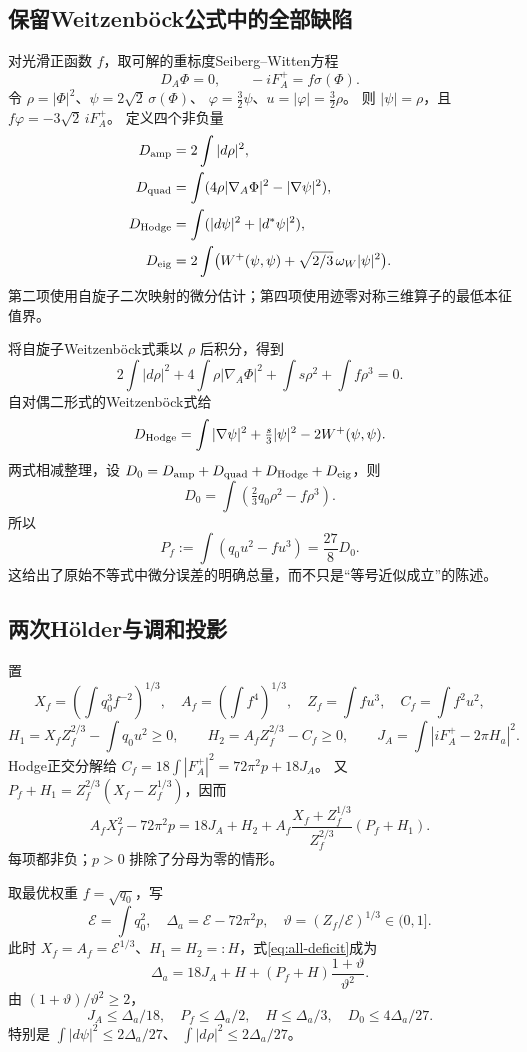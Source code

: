 \documentclass[UTF8,a4paper,11pt,fontset=fandol]{ctexart}
\numberwithin{equation}{section}
\theoremstyle{definition}
\begin{document}
\subsection{保留Weitzenb\"ock公式中的全部缺陷}
对光滑正函数 $f$，取可解的重标度Seiberg--Witten方程
\[
D_A\Phi=0,\qquad -iF_A^+=f\sigma(\Phi).
\]
令
$\rho=|\Phi|^2$、$\psi=2\sqrt2\,\sigma(\Phi)$、
$\varphi=\tfrac32\psi$、$u=|\varphi|=\tfrac32\rho$。
则 $|\psi|=\rho$，且 $f\varphi=-3\sqrt2\,iF_A^+$。
定义四个非负量
\begin{align*}
D_{\rm amp}&=2\int|d\rho|^2,\\
D_{\rm quad}&=\int(4\rho|\nabla_A\Phi|^2-|\nabla\psi|^2),\\
D_{\rm Hodge}&=\int(|d\psi|^2+|d^*\psi|^2),\\
D_{\rm eig}&=2\int\bigl(W^+(\psi,\psi)+\sqrt{2/3}\,\omega_W|\psi|^2\bigr).
\end{align*}
第二项使用自旋子二次映射的微分估计；第四项使用迹零对称三维算子的最低本征值界。

将自旋子Weitzenb\"ock式乘以 $\rho$ 后积分，得到
\[
2\int|d\rho|^2+4\int\rho|\nabla_A\Phi|^2+\int s\rho^2+\int f\rho^3=0.
\]
自对偶二形式的Weitzenb\"ock式给
\[
D_{\rm Hodge}=\int|\nabla\psi|^2+\tfrac{s}{3}|\psi|^2-2W^+(\psi,\psi).
\]
两式相减整理，设 $D_0=D_{\rm amp}+D_{\rm quad}+D_{\rm Hodge}+D_{\rm eig}$，则
\[
D_0=\int\left(\tfrac23q_0\rho^2-f\rho^3\right).
\]
所以
\begin{equation}\label{eq:spinor-deficit}
P_f:=\int(q_0u^2-fu^3)=\frac{27}{8}D_0.
\end{equation}
这给出了原始不等式中微分误差的明确总量，而不只是“等号近似成立”的陈述。

\subsection{两次H\"older与调和投影}
置
\[
X_f=\left(\int q_0^3f^{-2}\right)^{1/3},\quad
A_f=\left(\int f^4\right)^{1/3},\quad
Z_f=\int fu^3,\quad C_f=\int f^2u^2,
\]
\[
H_1=X_fZ_f^{2/3}-\int q_0u^2\ge0,\qquad
H_2=A_fZ_f^{2/3}-C_f\ge0,\qquad
J_A=\int|iF_A^+-2\pi H_a|^2.
\]
Hodge正交分解给
$C_f=18\int|F_A^+|^2=72\pi^2p+18J_A$。
又 $P_f+H_1=Z_f^{2/3}(X_f-Z_f^{1/3})$，因而
\begin{equation}\label{eq:all-deficit}
A_fX_f^2-72\pi^2p
=18J_A+H_2+
A_f\frac{X_f+Z_f^{1/3}}{Z_f^{2/3}}(P_f+H_1).
\end{equation}
每项都非负；$p>0$ 排除了分母为零的情形。

取最优权重 $f=\sqrt{q_0}$，写
\[
\mathcal E=\int q_0^2,\quad
\Delta_a=\mathcal E-72\pi^2p,\quad
\vartheta=(Z_f/\mathcal E)^{1/3}\in(0,1].
\]
此时 $X_f=A_f=\mathcal E^{1/3}$、$H_1=H_2=:H$，式\eqref{eq:all-deficit}成为
\[
\Delta_a=18J_A+H+(P_f+H)\frac{1+\vartheta}{\vartheta^2}.
\]
由 $(1+\vartheta)/\vartheta^2\ge2$，
\begin{equation}\label{eq:quantSW}
J_A\le\Delta_a/18,\quad P_f\le\Delta_a/2,\quad
H\le\Delta_a/3,\quad D_0\le4\Delta_a/27.
\end{equation}
特别是
$\int|d\psi|^2\le2\Delta_a/27$、
$\int|d\rho|^2\le2\Delta_a/27$。
\end{document}
